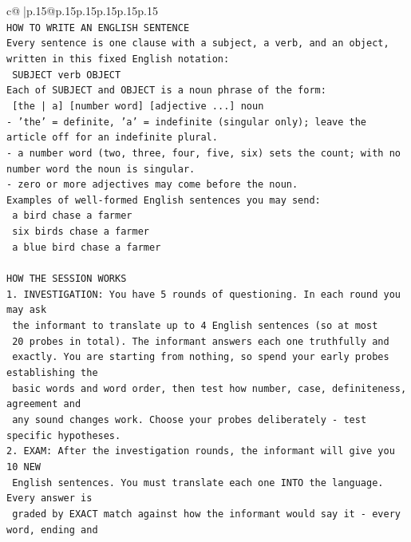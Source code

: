 \documentclass{article}
\begin{document}
{\begin{supertabular}{c@{$\;$}|p{.15\linewidth}@{}p{.15\linewidth}p{.15\linewidth}p{.15\linewidth}p{.15\linewidth}p{.15\linewidth}}
{{{\\ 
\texttt{HOW TO WRITE AN ENGLISH SENTENCE} \\
\texttt{Every sentence is one clause with a subject, a verb, and an object, written in this fixed English notation:} \\
\texttt{    SUBJECT  verb  OBJECT} \\
\texttt{Each of SUBJECT and OBJECT is a noun phrase of the form:} \\
\texttt{    {[}the | a{]}  {[}number word{]}  {[}adjective ...{]}  noun} \\
\texttt{{-} 'the' = definite, 'a' = indefinite (singular only); leave the article off for an indefinite plural.} \\
\texttt{{-} a number word (two, three, four, five, six) sets the count; with no number word the noun is singular.} \\
\texttt{{-} zero or more adjectives may come before the noun.} \\
\texttt{Examples of well{-}formed English sentences you may send:} \\
\texttt{    a bird chase a farmer} \\
\texttt{    six birds chase a farmer} \\
\texttt{    a blue bird chase a farmer} \\
\\ 
\texttt{HOW THE SESSION WORKS} \\
\texttt{1. INVESTIGATION: You have 5 rounds of questioning. In each round you may ask} \\
\texttt{   the informant to translate up to 4 English sentences (so at most} \\
\texttt{   20 probes in total). The informant answers each one truthfully and} \\
\texttt{   exactly. You are starting from nothing, so spend your early probes establishing the} \\
\texttt{   basic words and word order, then test how number, case, definiteness, agreement and} \\
\texttt{   any sound changes work. Choose your probes deliberately {-} test specific hypotheses.} \\
\texttt{2. EXAM: After the investigation rounds, the informant will give you 10 NEW} \\
\texttt{   English sentences. You must translate each one INTO the language. Every answer is} \\
\texttt{   graded by EXACT match against how the informant would say it {-} every word, ending and} \\
}}}
\end{supertabular}}
\end{document}
